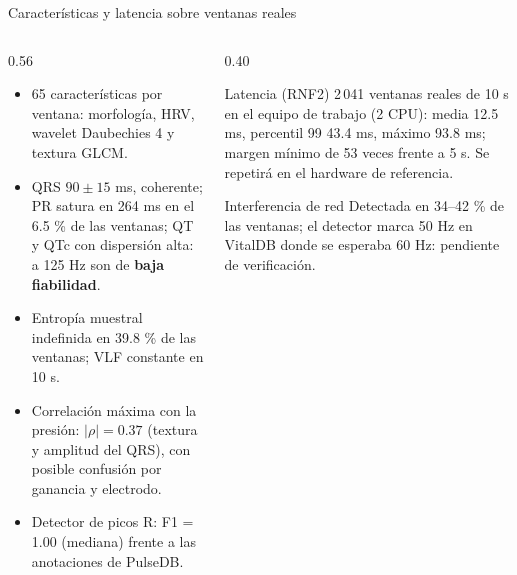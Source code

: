 \documentclass[aspectratio=169]{beamer}
\begin{document}
\begin{frame}{Características y latencia sobre ventanas reales}
  \begin{columns}[T]
    \begin{column}{0.56\textwidth}
      \small
      \begin{itemize}
        \item 65 características por ventana: morfología, HRV, wavelet Daubechies 4 y textura GLCM.
        \item QRS $90\pm15$ ms, coherente; PR satura en 264 ms en el 6.5 \% de las ventanas;
              QT y QTc con dispersión alta: a 125 Hz son de \textbf{baja fiabilidad}.
        \item Entropía muestral indefinida en 39.8 \% de las ventanas; VLF constante en 10 s.
        \item Correlación máxima con la presión: $|\rho| = 0.37$ (textura y amplitud del QRS),
              con posible confusión por ganancia y electrodo.
        \item Detector de picos R: F1 = 1.00 (mediana) frente a las anotaciones de PulseDB.
      \end{itemize}
    \end{column}
    \begin{column}{0.40\textwidth}
      \begin{block}{Latencia (RNF2)}
        \small
        2\,041 ventanas reales de 10 s en el equipo de trabajo (2 CPU):
        media 12.5 ms, percentil 99 43.4 ms, máximo 93.8 ms; margen mínimo de 53 veces
        frente a 5 s. Se repetirá en el hardware de referencia.
      \end{block}
      \begin{block}{Interferencia de red}
        \small
        Detectada en 34--42 \% de las ventanas; el detector marca 50 Hz en VitalDB donde se
        esperaba 60 Hz: pendiente de verificación.
      \end{block}
    \end{column}
  \end{columns}
\end{frame}
\end{document}
